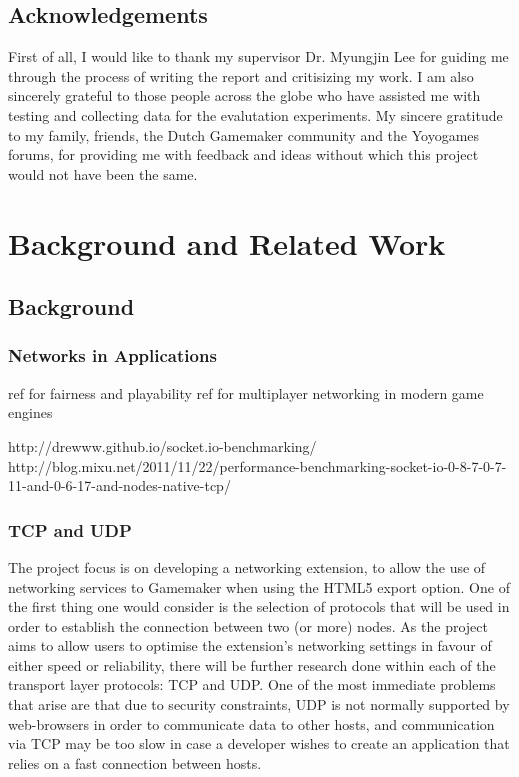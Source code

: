 \documentclass[bsc,frontabs,twoside,singlespacing,parskip,deptreport]{infthesis}     %
\begin{document}
\section*{Acknowledgements}
First of all, I would like to thank my supervisor Dr. Myungjin Lee for guiding me through the process of writing the report and critisizing my work.
I am also sincerely grateful to those people across the globe who have assisted me with testing and collecting data for the evalutation experiments. My sincere gratitude to my family, friends, the Dutch Gamemaker community and the Yoyogames forums, for providing me with feedback and ideas without which this project would not have been the same.
\tableofcontents




\chapter{Background and Related Work}
\section{Background}
\subsection{Networks in Applications}
ref for fairness and playability \cite{Fairness_and_Playability}
ref for multiplayer networking in modern game engines \cite{Multiplayer_Networking_modern_engine}

http://drewww.github.io/socket.io-benchmarking/
\\http://blog.mixu.net/2011/11/22/performance-benchmarking-socket-io-0-8-7-0-7-11-and-0-6-17-and-nodes-native-tcp/
\subsection{TCP and UDP}
The project focus is on developing a networking extension, to allow the use of networking services to Gamemaker when using the HTML5 export option. One of the first thing one would consider is the selection of protocols that will be used in order to establish the connection between two (or more) nodes. As the project aims to allow users to optimise the extension's networking settings in favour of either speed or reliability, there will be further research done within each of the transport layer protocols: TCP and UDP.
One of the most immediate problems that arise are that due to security constraints, UDP is not normally supported by web-browsers in order to communicate data to other hosts, and communication via TCP may be too slow in case a developer wishes to create an application that relies on a fast connection between hosts.
\end{document}
